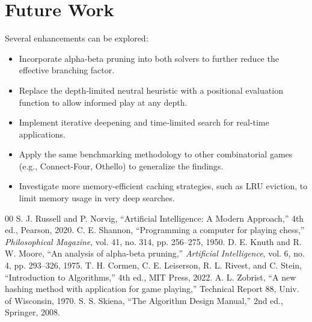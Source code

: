 \documentclass[conference]{IEEEtran}
\begin{document}
\section{Future Work}

Several enhancements can be explored:
\begin{itemize}
    \item Incorporate alpha‑beta pruning into both solvers to further
          reduce the effective branching factor.
    \item Replace the depth‑limited neutral heuristic with a positional
          evaluation function to allow informed play at any depth.
    \item Implement iterative deepening and time‑limited search for
          real‑time applications.
    \item Apply the same benchmarking methodology to other combinatorial
          games (e.g., Connect‑Four, Othello) to generalize the findings.
    \item Investigate more memory‑efficient caching strategies, such as
          LRU eviction, to limit memory usage in very deep searches.
\end{itemize}

\begin{thebibliography}{00}
 S. J. Russell and P. Norvig, ``Artificial Intelligence:
A Modern Approach,'' 4th ed., Pearson, 2020.
 C. E. Shannon, ``Programming a computer for playing chess,''
\textit{Philosophical Magazine}, vol. 41, no. 314, pp. 256--275, 1950.
 D. E. Knuth and R. W. Moore, ``An analysis of alpha-beta
pruning,'' \textit{Artificial Intelligence}, vol. 6, no. 4,
pp. 293--326, 1975.
 T. H. Cormen, C. E. Leiserson, R. L. Rivest, and C. Stein,
``Introduction to Algorithms,'' 4th ed., MIT Press, 2022.
 A. L. Zobrist, ``A new hashing method with application for
game playing,'' Technical Report 88, Univ. of Wisconsin, 1970.
 S. S. Skiena, ``The Algorithm Design Manual,'' 2nd ed.,
Springer, 2008.
\end{thebibliography}
\end{document}
